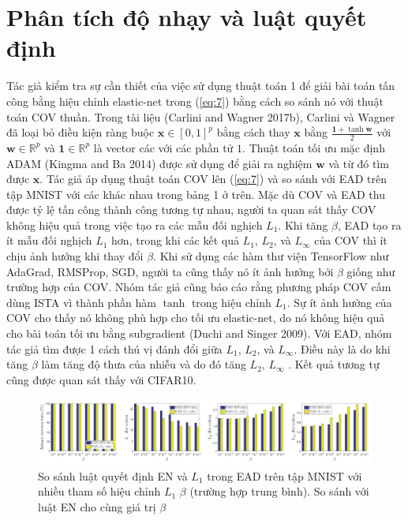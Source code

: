 \section{Phân tích độ nhạy và luật quyết định}
Tác giả kiểm tra sự cần thiết của việc sử dụng thuật toán 1 để giải bài toán tấn công bằng hiệu chỉnh elastic-net trong (\ref{eq:7}) bằng cách so sánh nó với thuật toán COV thuần. Trong tài liệu (Carlini and Wagner 2017b), Carlini và Wagner đã loại bỏ điều kiện ràng buộc $\mathbf{x} \in [0,1]^p$ bằng cách thay $\mathbf{x}$ bằng $\frac{\mathbf{1} + \tanh \mathbf{w}}{2}$ với $\mathbf{w} \in \mathbb{R}^p$ và $\mathbf{1} \in \mathbb{R}^p$ là vector các với các phần tử $1$. Thuật toán tối ưu mặc định ADAM (Kingma and Ba 2014) được sử dụng để giải ra nghiệm $\mathbf{w}$ và từ đó tìm được $\mathbf{x}$. Tác giả áp dụng thuật toán COV lên (\ref{eq:7}) và so sánh với EAD trên tập MNIST với các  khác nhau trong bảng 1 ở trên. Mặc dù COV và EAD thu được tỷ lệ tấn công thành công tương tự nhau, người ta quan sát thấy COV không hiệu quả trong việc tạo ra các mẫu đối nghịch $L_1$. Khi tăng $\beta$, EAD tạo ra ít mẫu đối nghịch $L_1$ hơn, trong khi các kết quả $L_1$, $L_2$, và $L_{\infty}$ của COV thì ít chịu ảnh hưởng khi thay đổi $\beta$. Khi sử dụng các hàm thư viện TensorFlow như AdaGrad, RMSProp, SGD, người ta cũng thấy nó ít ảnh hưởng bởi $\beta$  giống như trường hợp của COV. Nhóm tác giả cũng báo cáo rằng phương pháp COV cấm dùng ISTA vì thành phần hàm $\tanh$ trong hiệu chỉnh $L_1$. Sự ít ảnh hưởng của COV cho thấy nó không phù hợp cho tối ưu elastic-net, do nó không hiệu quả cho bài toán tối ưu bằng subgradient (Duchi and Singer 2009). Với EAD, nhóm tác giả tìm được 1 cách thú vị đánh đổi giữa $L_1$, $L_2$, và $L_{\infty}$. Điều này là do khi tăng $\beta$ làm tăng độ thưa của nhiễu và do đó tăng $L_2$, $L_{\infty}$ . Kết quả tương tự cũng được quan sát thấy với CIFAR10.
\begin{figure}[H] %
    \centering %
    \includegraphics[width=1\textwidth]{assets/fig_02.png} 
    \caption{So sánh luật quyết định EN và $L_1$ trong EAD trên tập MNIST với nhiều tham số hiệu chỉnh $L_1$ $\beta$ (trường hợp trung bình). So sánh với luật EN cho cùng giá trị $\beta$} %
    \label{fig:fg_02}
\end{figure}

